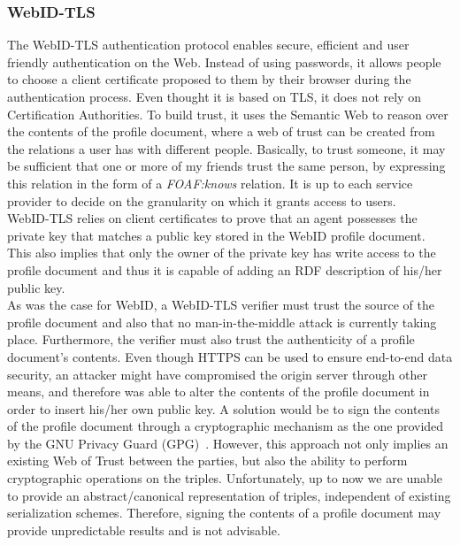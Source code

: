 \subsubsection{WebID-TLS}
The WebID-TLS authentication protocol enables secure, efficient and user friendly authentication on the Web. Instead of using passwords, it allows people to choose a client certificate proposed to them by their browser during the authentication process. Even thought it is based on TLS, it does not rely on Certification Authorities. To build trust, it uses the Semantic Web to reason over the contents of the profile document, where a web of trust can be created from the relations a user has with different people. Basically, to trust someone, it may be sufficient that one or more of my friends trust the same person, by expressing this relation in the form of a \textit{FOAF:knows} relation. It is up to each service provider to decide on the granularity on which it grants access to users.\\

WebID-TLS relies on client certificates to prove that an agent possesses the private key that matches a public key stored in the WebID profile document. This also implies that only the owner of the private key has write access to the profile document and thus it is capable of adding an RDF description of his/her public key.\\

As was the case for WebID, a WebID-TLS verifier must trust the source of the profile document and also that no man-in-the-middle attack is currently taking place. Furthermore, the verifier must also trust the authenticity of a profile document's contents. Even though HTTPS can be used to ensure end-to-end data security, an attacker might have compromised the origin server through other means, and therefore was able to alter the contents of the profile document in order to insert his/her own public key. A solution would be to sign the contents of the profile document through a cryptographic mechanism as the one provided by the GNU Privacy Guard (GPG)~\cite{koch2003gnu}. However, this approach not only implies an existing Web of Trust between the parties, but also the ability to perform cryptographic operations on the triples. Unfortunately, up to now we are unable to provide an abstract/canonical representation of triples, independent of existing serialization schemes. Therefore, signing the contents of a profile document may provide unpredictable results and is not advisable.

